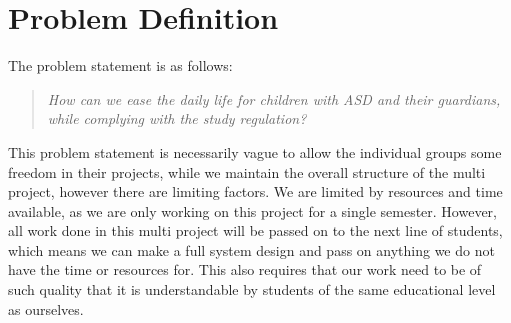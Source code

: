 \section{Problem Definition}
\label{sec:pdef}
The problem statement is as follows:

\begin{quotation}
\textit{How can we ease the daily life for children with ASD and their guardians, while complying with the study regulation?}
\end{quotation}

This problem statement is necessarily vague to allow the individual groups some freedom in their projects, while we maintain the overall structure of the multi project, however there are limiting factors.
We are limited by resources and time available, as we are only working on this project for a single semester. 
However, all work done in this multi project will be passed on to the next line of students, which means we can make a full system design and pass on anything we do not have the time or resources for.
This also requires that our work need to be of such quality that it is understandable by students of the same educational level as ourselves.